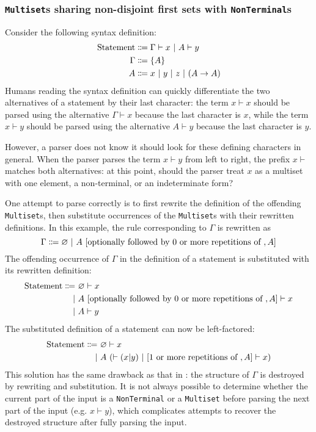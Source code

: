\subsubsection{\texorpdfstring{\lstinline{Multiset}}{Multiset}s sharing non-disjoint first sets with \texorpdfstring{\lstinline{NonTerminal}}{NonTerminal}s}
Consider the following syntax definition:
\begin{align*}
    \text{Statement} &\Coloneqq \Gamma \vdash x \ |\  A \vdash y \\
    \Gamma &\Coloneqq \{ A \} \\
    A &\Coloneqq x \ |\  y \ |\  z \ |\  (A \to A)
\end{align*}
Humans reading the syntax definition can quickly differentiate the two alternatives of a statement by their last character: the term $x \vdash x$ should be parsed using the alternative $\Gamma \vdash x$ because the last character is $x$, while the term $x \vdash y$ should be parsed using the alternative $A \vdash y$ because the last character is $y$.

However, a parser does not know it should look for these defining characters in general. When the parser parses the term $x \vdash y$ from left to right, the prefix $x \vdash$ matches both alternatives: at this point, should the parser treat $x$ as a multiset with one element, a non-terminal, or an indeterminate form?

One attempt to parse correctly is to first rewrite the definition of the offending \lstinline{Multiset}s, then substitute occurrences of the \lstinline{Multiset}s with their rewritten definitions. In this example, the rule corresponding to $\Gamma$ is rewritten as
\[
    \Gamma \Coloneqq \varnothing \ |\  A \ [\text{optionally followed by 0 or more repetitions of },A]
\]
The offending occurrence of $\Gamma$ in the definition of a statement is substituted with its rewritten definition:
\begin{align*}
    \text{Statement} \Coloneqq \ &\varnothing \vdash x \\
    \ |\  &A \ [\text{optionally followed by 0 or more repetitions of },A] \vdash x \\
    \ |\  &A \vdash y
\end{align*}
The substituted definition of a statement can now be left-factored:
\begin{align*}
    \text{Statement} \Coloneqq \ &\varnothing \vdash x \\
    \ |\  &A \ (\vdash (x|y) \ |\  [\text{1 or more repetitions of },A] \vdash x)
\end{align*}
This solution has the same drawback as that in : the structure of $\Gamma$ is destroyed by rewriting and substitution. It is not always possible to determine whether the current part of the input is a \lstinline{NonTerminal} or a \lstinline{Multiset} before parsing the next part of the input (e.g. $x \vdash y$), which complicates attempts to recover the destroyed structure after fully parsing the input.

